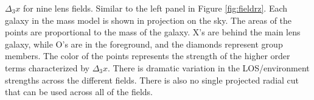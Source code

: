 \label{fig:allfields} $\Delta_3x$ for nine lens fields. Similar to the left panel in Figure \ref{fig:fieldrz}. Each galaxy in the mass model is shown in projection on the sky. The areas of the points are proportional to the mass of the galaxy. X's are behind the main lens galaxy, while O's are in the foreground, and the diamonds represent group members. The color of the points represents the strength of the higher order terms characterized by $\Delta_3 x$. There is dramatic variation in the LOS/environment strengths across the different fields. There is also no single projected radial cut that can be used across all of the fields.